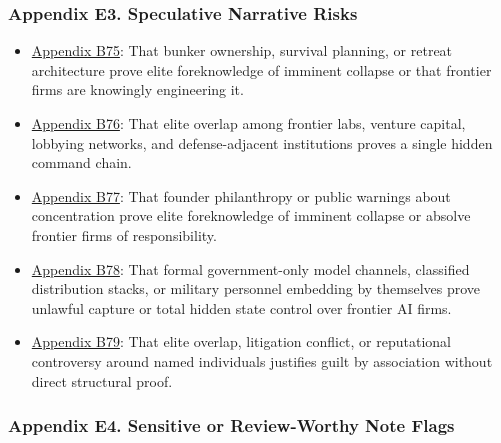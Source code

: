 \documentclass[
  american,
  11pt,
  letterpaper,
]{article}
\providecommand{\tightlist}{%
  \setlength{\itemsep}{0pt}\setlength{\parskip}{0pt}}
\begin{document}
\subsubsection{Appendix E3. Speculative Narrative
Risks}\label{appendix-e3-speculative-narrative-risks}

\begin{itemize}
\tightlist
\item
  \hyperref[appendix-b75-bunker-ownership-survival-planning-or-retreat-architecture-prove-elite-foreknow]{Appendix
  B75}: That bunker ownership, survival planning, or retreat
  architecture prove elite foreknowledge of imminent collapse or that
  frontier firms are knowingly engineering it.
\item
  \hyperref[appendix-b76-elite-overlap-among-frontier-labs-venture-capital-lobbying-networks-and-defens]{Appendix
  B76}: That elite overlap among frontier labs, venture capital,
  lobbying networks, and defense-adjacent institutions proves a single
  hidden command chain.
\item
  \hyperref[appendix-b77-founder-philanthropy-or-public-warnings-about-concentration-prove-elite-foreknowl]{Appendix
  B77}: That founder philanthropy or public warnings about concentration
  prove elite foreknowledge of imminent collapse or absolve frontier
  firms of responsibility.
\item
  \hyperref[appendix-b78-formal-government-only-model-channels-classified-distribution-stacks-or-militar]{Appendix
  B78}: That formal government-only model channels, classified
  distribution stacks, or military personnel embedding by themselves
  prove unlawful capture or total hidden state control over frontier AI
  firms.
\item
  \hyperref[appendix-b79-elite-overlap-litigation-conflict-or-reputational-controversy-around-named-indi]{Appendix
  B79}: That elite overlap, litigation conflict, or reputational
  controversy around named individuals justifies guilt by association
  without direct structural proof.
\end{itemize}

\subsubsection{Appendix E4. Sensitive or Review-Worthy Note
Flags}\label{appendix-e4-sensitive-or-review-worthy-note-flags}
\end{document}
